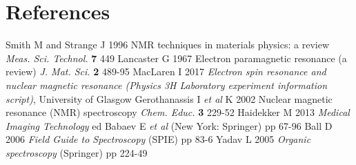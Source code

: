\documentclass[a4paper]{jpconf}
\numberwithin{equation}{section}
\begin{document}

\section*{References}
\begin{thebibliography}{9}
 Smith M and Strange J 1996 NMR techniques in materials physics: a review \textit{Meas. Sci. Technol.} \textbf{7} 449
 Lancaster G 1967 Electron paramagnetic resonance (a review) \textit{J. Mat. Sci.} \textbf{2} 489-95
 MacLaren I 2017 \textit{Electron spin resonance and nuclear magnetic resonance (Physics 3H Laboratory experiment information script)}, University of Glasgow
 Gerothanassis I \textit{et al} K 2002 Nuclear magnetic resonance (NMR) spectroscopy \textit{Chem. Educ.} \textbf{3} 229-52
 Haidekker M 2013 \textit{Medical Imaging Technology} ed Babaev E \textit{et al} (New York: Springer) pp 67-96
 Ball D 2006 \textit{Field Guide to Spectroscopy} (SPIE) pp 83-6
 Yadav L 2005 \textit{Organic spectroscopy} (Springer) pp 224-49
\end{thebibliography}
\end{document}
